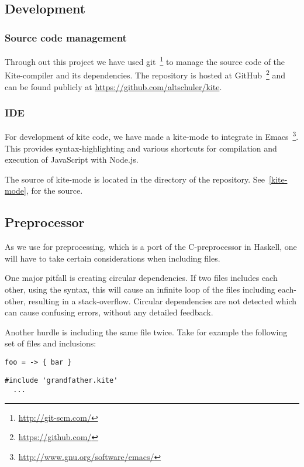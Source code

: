 
\subsection{Development}
\subsubsection{Source code management}
Through out this project we have used git~\footnote{\url{http://git-scm.com/}} to manage the source code of the Kite-compiler and its dependencies. The repository is hosted at GitHub~\footnote{\url{https://github.com/}} and can be found publicly at \url{https://github.com/altschuler/kite}.

\subsubsection{IDE}
For development of kite code, we have made a kite-mode to integrate in Emacs~\footnote{\url{http://www.gnu.org/software/emacs/}}. This provides syntax-highlighting and various shortcuts for compilation and execution of JavaScript with Node.js.

The source of kite-mode is located in the  directory of the repository. See~\ref{kite-mode}, for the source.


\subsection{Preprocessor}
As we use \cite{wallace04} for preprocessing, which is a port of the C-preprocessor in Haskell, one will have to take certain considerations when including files.

One major pitfall is creating circular dependencies. If two files includes each other, using the  syntax, this will cause an infinite loop of the files including each-other, resulting in a stack-overflow. Circular dependencies are not detected which can cause confusing errors, without any detailed feedback.

Another hurdle is including the same file twice. Take for example the following set of files and inclusions:

\begin{lstlisting}[caption=\code{grandfather.kite}]
  foo = -> { bar }
\end{lstlisting}

\begin{lstlisting}[caption=\code{father.kite}]
  #include 'grandfather.kite'
  ...
\end{lstlisting}

